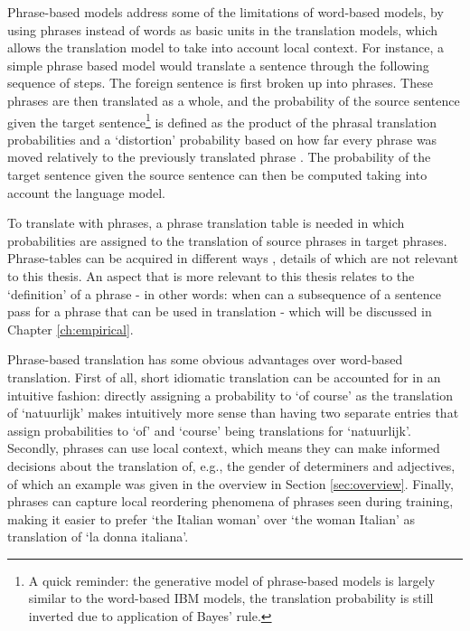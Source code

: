 Phrase-based models address some of the limitations of word-based models, by using phrases instead of words as basic units in the translation models, which allows the translation model to take into account local context. For instance, a simple phrase based model would translate a sentence through the following sequence of steps. The foreign sentence is first broken up into phrases. These phrases are then translated as a whole, and the probability of the source sentence given the target sentence\footnote{A quick reminder: the generative model of phrase-based models is largely similar to the word-based IBM models, the translation probability is still inverted due to application of Bayes' rule.} is defined as the product of the phrasal translation probabilities and a `distortion' probability based on how far every phrase was moved relatively to the previously translated phrase \citep{koehn2003statistical}. The probability of the target sentence given the source sentence can then be computed taking into account the language model.

To translate with phrases, a phrase translation table is needed in which probabilities are assigned to the translation of source phrases in target phrases. Phrase-tables can be acquired in different ways \citep{marcu2002phrase,och1999improved,koehn2003statistical,mylonakis_simaan_emnlp_2008}, details of which are not relevant to this thesis. An aspect that is more relevant to this thesis relates to the `definition' of a phrase -  in other words: when can a subsequence of a sentence pass for a phrase that can be used in translation - which will be discussed in Chapter \ref{ch:empirical}.

Phrase-based translation has some obvious advantages over word-based translation. First of all, short idiomatic translation can be accounted for in an intuitive fashion: directly assigning a probability to `of course' as the translation of `natuurlijk' makes intuitively more sense than having two separate entries that assign probabilities to `of' and `course' being translations for `natuurlijk'. Secondly, phrases can use local context, which means they can make informed decisions about the translation of, e.g., the gender of determiners and adjectives, of which an example was given in the overview in Section \ref{sec:overview}. Finally, phrases can capture local reordering phenomena of phrases seen during training, making it easier to prefer `the Italian woman' over `the woman Italian' as translation of `la donna italiana'.

